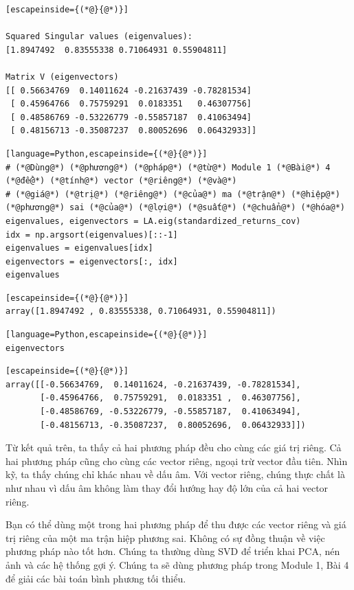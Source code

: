 \begin{lstlisting}[escapeinside={(*@}{@*)}]

Squared Singular values (eigenvalues):
[1.8947492  0.83555338 0.71064931 0.55904811]

Matrix V (eigenvectors)
[[ 0.56634769  0.14011624 -0.21637439 -0.78281534]
 [ 0.45964766  0.75759291  0.0183351   0.46307756]
 [ 0.48586769 -0.53226779 -0.55857187  0.41063494]
 [ 0.48156713 -0.35087237  0.80052696  0.06432933]]

\end{lstlisting}

\begin{lstlisting}[language=Python,escapeinside={(*@}{@*)}]
# (*@Dùng@*) (*@phương@*) (*@pháp@*) (*@từ@*) Module 1 (*@Bài@*) 4 (*@để@*) (*@tính@*) vector (*@riêng@*) (*@và@*) 
# (*@giá@*) (*@trị@*) (*@riêng@*) (*@của@*) ma (*@trận@*) (*@hiệp@*) (*@phương@*) sai (*@của@*) (*@lợi@*) (*@suất@*) (*@chuẩn@*) (*@hóa@*)
eigenvalues, eigenvectors = LA.eig(standardized_returns_cov)
idx = np.argsort(eigenvalues)[::-1]
eigenvalues = eigenvalues[idx]
eigenvectors = eigenvectors[:, idx]
eigenvalues
\end{lstlisting}

\begin{lstlisting}[escapeinside={(*@}{@*)}]
array([1.8947492 , 0.83555338, 0.71064931, 0.55904811])
\end{lstlisting}

\begin{lstlisting}[language=Python,escapeinside={(*@}{@*)}]
eigenvectors
\end{lstlisting}

\begin{lstlisting}[escapeinside={(*@}{@*)}]
array([[-0.56634769,  0.14011624, -0.21637439, -0.78281534],
       [-0.45964766,  0.75759291,  0.0183351 ,  0.46307756],
       [-0.48586769, -0.53226779, -0.55857187,  0.41063494],
       [-0.48156713, -0.35087237,  0.80052696,  0.06432933]])
\end{lstlisting}

Từ kết quả trên, ta thấy cả hai phương pháp đều cho cùng các giá trị riêng. Cả hai phương pháp cũng cho cùng các vector riêng, ngoại trừ vector đầu tiên. Nhìn kỹ, ta thấy chúng chỉ khác nhau về dấu âm. Với vector riêng, chúng thực chất là như nhau vì dấu âm không làm thay đổi hướng hay độ lớn của cả hai vector riêng.

Bạn có thể dùng một trong hai phương pháp để thu được các vector riêng và giá trị riêng của một ma trận hiệp phương sai. Không có sự đồng thuận về việc phương pháp nào tốt hơn. Chúng ta thường dùng SVD để triển khai PCA, nén ảnh và các hệ thống gợi ý. Chúng ta sẽ dùng phương pháp trong Module 1, Bài 4 để giải các bài toán bình phương tối thiểu.

